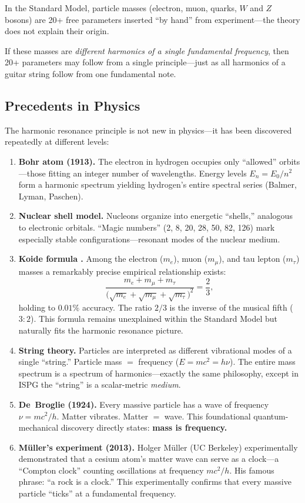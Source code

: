 \documentclass[11pt]{article}
\begin{document}
In the Standard Model, particle masses (electron, muon, quarks, $W$
and $Z$ bosons) are 20+ free parameters inserted ``by hand'' from
experiment---the theory does not explain their origin.

If these masses are \emph{different harmonics of a single
fundamental frequency}, then 20+ parameters may follow from a
single principle---just as all harmonics of a guitar string follow
from one fundamental note.

\subsection{Precedents in Physics}

The harmonic resonance principle is not new in physics---it has been
discovered repeatedly at different levels:
\begin{enumerate}
  \item \textbf{Bohr atom (1913).} The electron in hydrogen occupies
    only ``allowed'' orbits---those fitting an integer number of
    wavelengths. Energy levels $E_n = E_0/n^2$ form a harmonic
    spectrum yielding hydrogen's entire spectral series (Balmer,
    Lyman, Paschen).
  \item \textbf{Nuclear shell model.} Nucleons organize into
    energetic ``shells,'' analogous to electronic orbitals. ``Magic
    numbers'' (2, 8, 20, 28, 50, 82, 126) mark especially stable
    configurations---resonant modes of the nuclear medium.
  \item \textbf{Koide formula \cite{Koide1982}.} Among the electron ($m_e$),
    muon ($m_\mu$), and tau lepton ($m_\tau$) masses a remarkably
    precise empirical relationship exists:
    \begin{equation}
      \frac{m_e + m_\mu + m_\tau}
           {\bigl(\sqrt{m_e} + \sqrt{m_\mu}
            + \sqrt{m_\tau}\bigr)^2}
      = \frac{2}{3},
      \label{eq:koide}
    \end{equation}
    holding to $0.01\%$ accuracy. The ratio $2/3$ is the inverse of
    the musical fifth ($3{:}2$). This formula remains unexplained
    within the Standard Model but naturally fits the harmonic
    resonance picture.
  \item \textbf{String theory.} Particles are interpreted as
    different vibrational modes of a single ``string.'' Particle
    mass $=$ frequency ($E = mc^2 = h\nu$). The entire mass
    spectrum is a spectrum of harmonics---exactly the same
    philosophy, except in ISPG the ``string'' is a scalar-metric
    \emph{medium}.
  \item \textbf{De~Broglie (1924).} Every massive particle has a
    wave of frequency $\nu = mc^2/h$. Matter vibrates. Matter $=$
    wave. This foundational quantum-mechanical discovery directly
    states: \textbf{mass is frequency.}
  \item \textbf{M\"uller's experiment (2013).} Holger M\"uller
    (UC Berkeley) experimentally demonstrated that a cesium atom's
    matter wave can serve as a clock---a ``Compton clock'' counting
    oscillations at frequency $mc^2/h$. His famous phrase: ``a rock
    is a clock.'' This experimentally confirms that every massive
    particle ``ticks'' at a fundamental frequency.
\end{enumerate}
\end{document}
